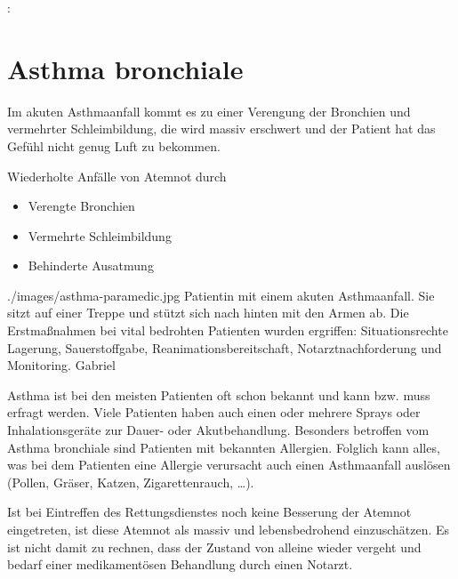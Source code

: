  {%
: 
\\
}{}

 

\nocite{Wuttig2009}


\section{Asthma bronchiale}
\label{topic:asthma-bronchiale}



{
Im akuten Asthmaanfall kommt es zu einer Verengung der
Bronchien und vermehrter Schleimbildung, die 
wird massiv erschwert und der Patient hat das Gefühl nicht
genug Luft zu bekommen.
}{%
Wiederholte Anfälle von Atemnot durch

\begin{itemize}
  \item Verengte Bronchien
  \item Vermehrte Schleimbildung
  \item Behinderte Ausatmung
\end{itemize}
}
{./images/asthma-paramedic.jpg}
{Patientin mit einem akuten Asthmaanfall. Sie sitzt auf einer Treppe und stützt sich nach hinten mit
den Armen ab. Die Erstmaßnahmen bei vital bedrohten
Patienten wurden ergriffen: Situationsrechte Lagerung,
Sauerstoffgabe, Reanimationsbereitschaft, Notarztnachforderung und Monitoring.\label{fig:asthma-paramedic}
}
{Gabriel}

Asthma ist bei den meisten Patienten oft schon bekannt und
kann bzw. muss erfragt werden. Viele Patienten haben auch
einen oder mehrere Sprays oder Inhalationsgeräte zur Dauer-
oder Akutbehandlung. 
Besonders betroffen vom Asthma bronchiale sind Patienten
mit bekannten Allergien. Folglich kann alles, was bei dem
Patienten eine Allergie verursacht auch einen Asthmaanfall
auslösen (Pollen, Gräser, Katzen, Zigarettenrauch, \ldots). 

Ist bei Eintreffen des Rettungsdienstes noch keine
Besserung der Atemnot eingetreten, ist diese Atemnot als
massiv und lebensbedrohend einzuschätzen. Es ist nicht
damit zu rechnen, dass der Zustand von alleine wieder
vergeht und bedarf einer medikamentösen Behandlung durch einen
Notarzt. 



